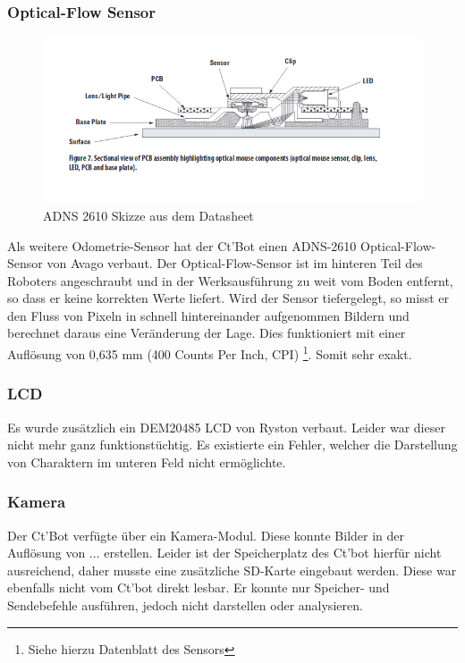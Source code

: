 \documentclass[twoside,12pt,a4paper]{report}
\begin{document}
	\subsubsection{Optical-Flow Sensor}
	\begin{figure}[!htb]
		\centering
		\includegraphics[scale=0.55]{images/adns.png}
		\caption{ADNS 2610 Skizze aus dem Datasheet}
	\end{figure}
	Als weitere Odometrie-Sensor hat der Ct'Bot einen ADNS-2610 Optical-Flow-Sensor von Avago verbaut. Der Optical-Flow-Sensor ist im hinteren Teil des Roboters angeschraubt und in der Werksausführung zu weit vom Boden entfernt, so dass er keine korrekten Werte liefert. Wird der Sensor tiefergelegt, so misst er den Fluss von Pixeln in schnell hintereinander aufgenommen Bildern und berechnet daraus eine Veränderung der Lage. Dies funktioniert mit einer Auflösung von 0,635 mm (400 Counts Per Inch, CPI) \footnote{Siehe hierzu Datenblatt des Sensors}. Somit sehr exakt. 
	
	\subsubsection{LCD}
	Es wurde zusätzlich ein DEM20485 LCD von Ryston verbaut. Leider war dieser nicht mehr ganz funktionstüchtig. Es existierte ein Fehler, welcher die Darstellung von Charaktern im unteren Feld nicht ermöglichte. 
	
	\subsubsection{Kamera}
	Der Ct'Bot verfügte über ein Kamera-Modul. Diese konnte Bilder in der Auflösung von ... erstellen. Leider ist der Speicherplatz des Ct'bot hierfür nicht ausreichend, daher musste eine zusätzliche SD-Karte eingebaut werden. Diese war ebenfalls nicht vom Ct'bot direkt lesbar. Er konnte nur Speicher- und Sendebefehle ausführen, jedoch nicht darstellen oder analysieren. 
	
\end{document}
